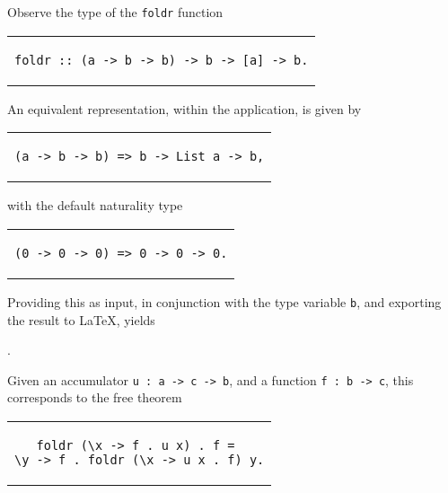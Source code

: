 \documentclass[../Dissertation.tex]{subfiles}
\begin{document}
\par
Observe the type of the \lstinline{foldr} function
\begin{center}
\begin{tabular}{c}
\begin{lstlisting}
foldr :: (a -> b -> b) -> b -> [a] -> b.
\end{lstlisting}
\end{tabular}
\end{center}
An equivalent representation, within the application, is given by
\begin{center}
\begin{tabular}{c}
\begin{lstlisting}
(a -> b -> b) => b -> List a -> b,
\end{lstlisting}
\end{tabular}
\end{center}
with the default naturality type
\begin{center}
\begin{tabular}{c}
\begin{lstlisting}
(0 -> 0 -> 0) => 0 -> 0 -> 0.
\end{lstlisting}
\end{tabular}
\end{center}
Providing this as input, in conjunction with the type variable \lstinline{b}, and exporting the result to LaTeX, yields
\begin{center}
  .
\end{center}
\noindent
Given an accumulator \lstinline{u : a -> c -> b}, and a function \lstinline{f : b -> c}, this corresponds to the free theorem
\begin{center}
\begin{tabular}{c}
\begin{lstlisting}[basicstyle=\ttfamily,style=haskellStyle]
foldr (\x -> f . u x) . f = 
\y -> f . foldr (\x -> u x . f) y.
\end{lstlisting}
\end{tabular}
\end{center}
\end{document}
